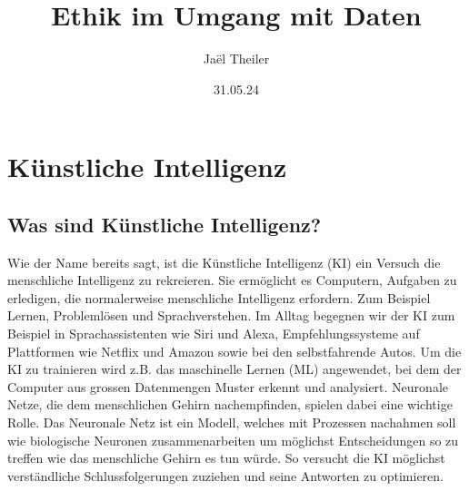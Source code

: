 \documentclass{article}
\title{Ethik im Umgang mit Daten}
\author{Jaël Theiler}
\date{31.05.24}
\begin{document}
\maketitle


\tableofcontents

\section{Künstliche Intelligenz}
\subsection{Was sind Künstliche Intelligenz?}
Wie der Name bereits sagt, ist die Künstliche Intelligenz (KI) ein Versuch die menschliche Intelligenz zu rekreieren. Sie ermöglicht es Computern, Aufgaben zu erledigen, die normalerweise menschliche Intelligenz erfordern. Zum Beispiel Lernen, Problemlösen und Sprachverstehen. Im Alltag begegnen wir der KI zum Beispiel in Sprachassistenten wie Siri und Alexa, Empfehlungssysteme auf Plattformen wie Netflix und Amazon sowie bei den selbstfahrende Autos.
Um die KI zu trainieren wird z.B. das maschinelle Lernen (ML) angewendet, bei dem der Computer aus grossen Datenmengen Muster erkennt und analysiert. Neuronale Netze, die dem menschlichen Gehirn nachempfinden, spielen dabei eine wichtige Rolle. Das Neuronale Netz ist ein Modell, welches mit Prozessen nachahmen soll wie biologische Neuronen zusammenarbeiten um möglichst Entscheidungen so zu treffen wie das menschliche Gehirn es tun würde. So versucht die KI möglichst verständliche Schlussfolgerungen zuziehen und seine Antworten zu optimieren.
\end{document}
